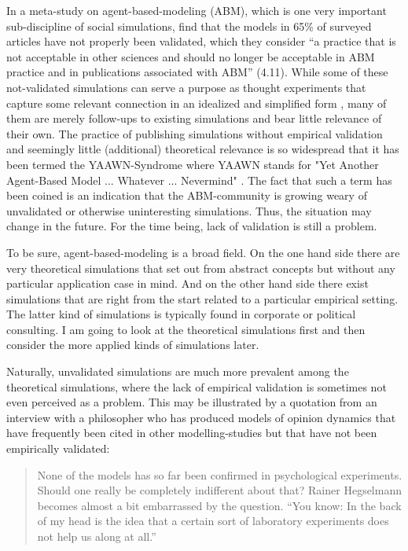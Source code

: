 \documentclass[12pt, a4paper]{article}
\begin{document}
In a meta-study on agent-based-modeling (ABM), which is one very
important sub-discipline of social simulations,
\citet{heath-et-al:2009} find that the models in 65\% of surveyed
articles have not properly been validated, which they consider ``a
practice that is not acceptable in other sciences and should no longer
be acceptable in ABM practice and in publications associated with
ABM'' (4.11). While some of these not-validated simulations can serve
a purpose as thought experiments that capture some relevant connection
in an idealized and simplified form \citep{reutlinger-et-al:2017},
many of them are merely follow-ups to existing simulations and bear
little relevance of their own. The practice of publishing simulations
without empirical validation and seemingly little (additional)
theoretical relevance is so widespread that it has been termed the
YAAWN-Syndrome where YAAWN stands for "Yet Another Agent-Based Model
... Whatever ... Nevermind" \citep{osullivan-et-al:2016}. The fact
that such a term has been coined is an indication that the
ABM-community is growing weary of unvalidated or otherwise
uninteresting simulations. Thus, the situation may change in the
future. For the time being, lack of validation is still a problem.

To be sure, agent-based-modeling is a broad field. On the one hand
side there are very theoretical simulations that set out from abstract
concepts but without any particular application case in mind. And on
the other hand side there exist simulations that are right from the
start related to a particular empirical setting. The latter kind of
simulations is typically found in corporate or political consulting. I
am going to look at the theoretical simulations first and then
consider the more applied kinds of simulations later.

Naturally, unvalidated simulations are much more prevalent among the
theoretical simulations, where the lack of empirical validation is
sometimes not even perceived as a problem. This may be illustrated by
a quotation from an interview with a philosopher who has produced
models of opinion dynamics \citep{hegselmann-krause:2002} that have
frequently been cited in other modelling-studies but that have not
been empirically validated:

\begin{quotation}
  None of the models has so far been confirmed in psychological
  experiments. Should one really be completely indifferent about that?
  Rainer Hegselmann becomes almost a bit embarrassed by the question.
  ``You know: In the back of my head is the idea that a certain sort
  of laboratory experiments does not help us along at all.'' \citep[p.
  2]{groetker:2005}
\end{quotation}
\end{document}

